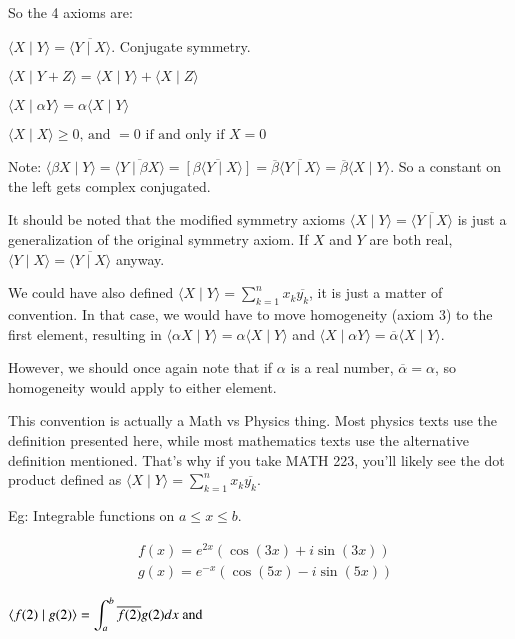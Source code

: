 \documentclass{report}
\begin{document}
So the 4 axioms are:

$\langle X \mid Y\rangle=\overline{\langle Y \mid X\rangle}$. Conjugate symmetry.

$\langle X \mid Y+Z\rangle=\langle X \mid Y\rangle+\langle X \mid Z\rangle $

$\langle X \mid \alpha Y\rangle=\alpha\langle X \mid Y\rangle$

$\langle X \mid X\rangle \geqslant 0 \text {, and }=0 \text { if and only if } X=0$

Note: $\langle\beta X \mid Y\rangle=\overline{\langle Y \mid \beta X\rangle}=\overline{[\beta\langle Y \mid X\rangle]}=\overline{\beta}\overline{\langle Y \mid X\rangle}=\overline{\beta}\langle X \mid Y\rangle$. So a constant on the left gets complex conjugated.

It should be noted that the modified symmetry axioms $\langle X \mid Y\rangle=\overline{\langle Y \mid X\rangle}$ is just a generalization of the original symmetry axiom. If $X$ and $Y$ are both real, $\langle Y\mid X \rangle = \overline{\langle Y\mid X \rangle}$ anyway.

We could have also defined $\langle X \mid Y\rangle=\sum\limits_{k=1}^{n} x_{k} \overline{y_{k}}$, it is just a matter of convention. In that case, we would have to move homogeneity (axiom 3) to the first element, resulting in $\langle\alpha X \mid  Y\rangle=\alpha\langle X \mid Y\rangle$ and $\langle X \mid \alpha Y\rangle=\overline{\alpha}\langle X \mid Y\rangle$. 

However, we should once again note that if $\alpha$ is a real number, $\overline\alpha = \alpha$, so homogeneity would apply to either element.

This convention is actually a Math vs Physics thing. Most physics texts use the definition presented here, while most mathematics texts use the alternative definition mentioned. That's why if you take MATH 223, you'll likely see the dot product defined as $\langle X \mid Y\rangle=\sum\limits_{k=1}^{n} x_{k} \overline{y_{k}}$.

Eg: Integrable functions on $a \leq x \leq b$.

$$
\begin{aligned}
& f(x)=e^{2 x}(\cos (3 x)+i \sin (3 x)) \\
& g(x)=e^{-x}(\cos (5 x)-i \sin (5 x)) 
\end{aligned}
$$

$\langle f(2) \mid g(2)\rangle=\displaystyle\int_{a}^{b} \overline{f(2)} g(2) d x \text { and } \\$
\end{document}
